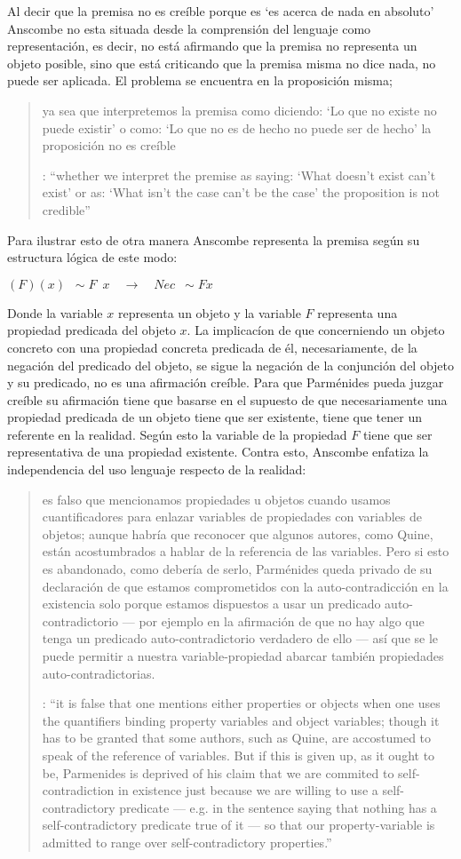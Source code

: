 Al decir que la premisa no es creíble porque es \enquote*{es acerca de nada en absoluto} Anscombe no esta situada desde la comprensión del lenguaje como representación, es decir, no está afirmando que la premisa no representa un objeto posible, sino que está criticando que la premisa misma no dice nada, no puede ser aplicada. El problema se encuentra en la proposición misma; \blockquote[{\cite[5]{anscombe1981parmenides:pmc}}: \enquote{whether we interpret the premise as saying: `What doesn't exist can't exist' or as: `What isn't the case can't be the case' the proposition is not credible}]{ya sea que interpretemos la premisa como diciendo: `Lo que no existe no puede existir' o como: `Lo que no es de hecho no puede ser de hecho' la proposición no es creíble}. Para ilustrar esto de otra manera Anscombe representa la premisa según su estructura lógica de este modo:
    \begin{center}$(F)(x)\enspace {\sim}F\enspace x\quad \longrightarrow\quad Nec\enspace {\sim}Fx$\end{center}
Donde la variable $x$ representa un objeto y la variable $F$ representa una propiedad predicada del objeto $x$. La implicacíon de que concerniendo un objeto concreto con una propiedad concreta predicada de él, necesariamente, de la negación del predicado del objeto, se sigue la negación de la conjunción del objeto y su predicado, no es una afirmación creíble. Para que Parménides pueda juzgar creíble su afirmación tiene que basarse en el supuesto de que necesariamente una propiedad predicada de un objeto tiene que ser existente, tiene que tener un referente en la realidad. Según esto la variable de la propiedad $F$ tiene que ser representativa de una propiedad existente. Contra esto, Anscombe enfatiza la independencia del uso lenguaje respecto de la realidad: \blockquote[{\cite[5]{anscombe1981parmenides:pmc}}: \enquote{it is false that one mentions either properties or objects when one uses the quantifiers binding property variables and object variables; though it has to be granted that some authors, such as Quine, are accostumed to speak of the reference of variables. But if this is given up, as it ought to be, Parmenides is deprived of his claim that we are commited to self-contradiction in existence just because we are willing to use a self-contradictory predicate --- e.g. in the sentence saying that nothing has a self-contradictory predicate true of it --- so that our property-variable is admitted to range over self-contradictory properties.}]{es falso que mencionamos propiedades u objetos cuando usamos cuantificadores para enlazar variables de propiedades con variables de objetos; aunque habría que reconocer que algunos autores, como Quine, están acostumbrados a hablar de la referencia de las variables. Pero si esto es abandonado, como debería de serlo, Parménides queda privado de su declaración de que estamos comprometidos con la auto-contradicción en la existencia solo porque estamos dispuestos a usar un predicado auto-contradictorio --- por ejemplo en la afirmación de que no hay algo que tenga un predicado auto-contradictorio verdadero de ello --- así que se le puede permitir a nuestra variable-propiedad abarcar también propiedades auto-contradictorias.}

